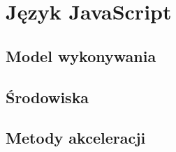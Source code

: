 \chapter{Język JavaScript}


\section{Model wykonywania}

\section{Środowiska}

\section{Metody akceleracji}
